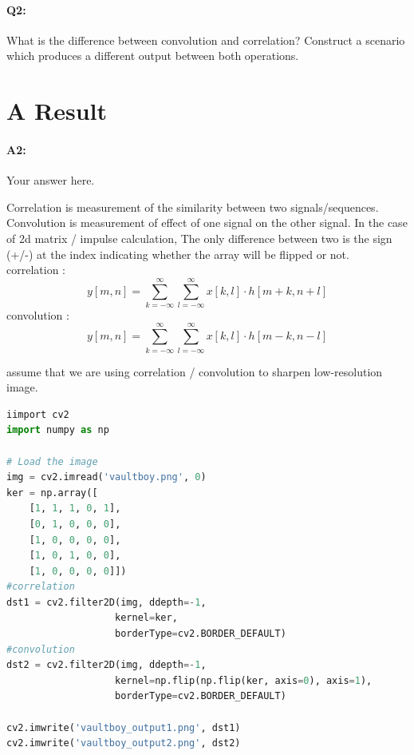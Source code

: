	
	
	\pagebreak
	\paragraph{Q2:} What is the difference between convolution and correlation? Construct a scenario which produces a different output between both operations.
	
	\section*{A Result}
	\paragraph{A2:} Your answer here.
	
	Correlation is measurement of the similarity between two signals/sequences. Convolution is measurement of effect of one signal on the other signal. In the case of 2d matrix / impulse calculation, The only difference between two is the sign (+/-) at the index indicating whether the array will be flipped or not.
	\\correlation :
	\[
	y[m,n] = \sum_{k=-\infty}^{\infty} \sum_{l=-\infty}^{\infty} x[k,l] \cdot h[m+k, n+l]
	\]
	convolution : 
	\[
	y[m,n] = \sum_{k=-\infty}^{\infty} \sum_{l=-\infty}^{\infty} x[k,l] \cdot h[m-k, n-l]
	\]

	assume that we are using correlation / convolution to sharpen low-resolution image.

	\begin{lstlisting}[language=Python]
iimport cv2
import numpy as np

# Load the image
img = cv2.imread('vaultboy.png', 0)
ker = np.array([
    [1, 1, 1, 0, 1],
    [0, 1, 0, 0, 0],
    [1, 0, 0, 0, 0],
    [1, 0, 1, 0, 0],
    [1, 0, 0, 0, 0]])
#correlation
dst1 = cv2.filter2D(img, ddepth=-1,
                   kernel=ker,
                   borderType=cv2.BORDER_DEFAULT)
#convolution
dst2 = cv2.filter2D(img, ddepth=-1,
                   kernel=np.flip(np.flip(ker, axis=0), axis=1),
                   borderType=cv2.BORDER_DEFAULT)

cv2.imwrite('vaultboy_output1.png', dst1)
cv2.imwrite('vaultboy_output2.png', dst2)
	\end{lstlisting}


